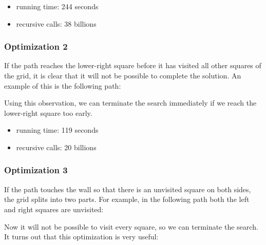 \begin{itemize}
\item
running time: 244 seconds
\item
recursive calls: 38 billions
\end{itemize}

\subsubsection{Optimization 2}

If the path reaches the lower-right square
before it has visited all other squares of the grid,
it is clear that
it will not be possible to complete the solution.
An example of this is the following path:

\begin{center}
\end{center}
Using this observation, we can terminate the search
immediately if we reach the lower-right square too early.
\begin{itemize}
\item
running time: 119 seconds
\item
recursive calls: 20 billions
\end{itemize}

\subsubsection{Optimization 3}

If the path touches the wall so that there is
an unvisited square on both sides,
the grid splits into two parts.
For example, in the following path
both the left and right squares
are unvisited:

\begin{center}
\end{center}
Now it will not be possible to visit every square,
so we can terminate the search.
It turns out that this optimization is very useful:

